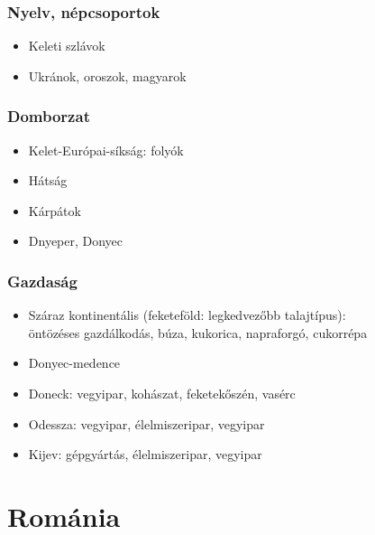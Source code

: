 \documentclass{article}
\begin{document}
\subsubsection{Nyelv, népcsoportok}

\begin{itemize}
    \item Keleti szlávok
    \item Ukránok, oroszok, magyarok
\end{itemize}

\subsubsection{Domborzat}

\begin{itemize}
    \item Kelet-Európai-síkság: folyók
    \item Hátság
    \item Kárpátok
    \item Dnyeper, Donyec
\end{itemize}

\subsubsection{Gazdaság}

\begin{itemize}
    \item Száraz kontinentális (feketeföld: legkedvezőbb talajtípus): \\
    öntözéses gazdálkodás, búza, kukorica, napraforgó, cukorrépa
    \item Donyec-medence
    \item Doneck: vegyipar, kohászat, feketekőszén, vasérc
    \item Odessza: vegyipar, élelmiszeripar, vegyipar
    \item Kijev: gépgyártás, élelmiszeripar, vegyipar
\end{itemize}

\section{Románia}
\end{document}
